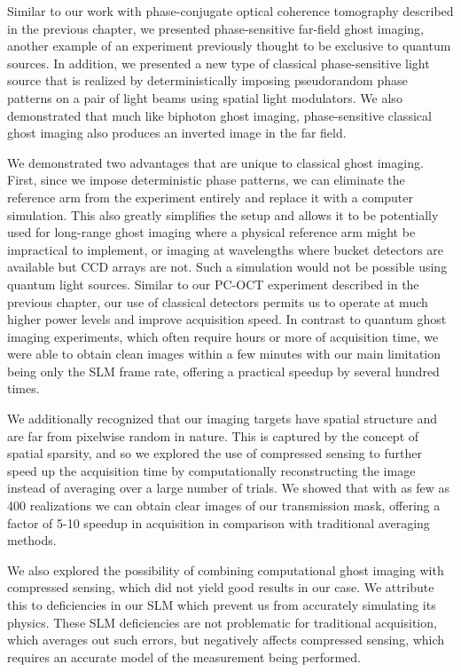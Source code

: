 Similar to our work with phase-conjugate optical coherence tomography described in the previous chapter, we presented phase-sensitive far-field ghost imaging, another example of an experiment previously thought to be exclusive to quantum sources. In addition, we presented a new type of classical phase-sensitive light source that is realized by deterministically imposing pseudorandom phase patterns on a pair of light beams using spatial light modulators. We also demonstrated that much like biphoton ghost imaging, phase-sensitive classical ghost imaging also produces an inverted image in the far field.

We demonstrated two advantages that are unique to classical ghost imaging. First, since we impose deterministic phase patterns, we can eliminate the reference arm from the experiment entirely and replace it with a computer simulation. This also greatly simplifies the setup and allows it to be potentially used for long-range ghost imaging where a physical reference arm might be impractical to implement, or imaging at wavelengths where bucket detectors are available but CCD arrays are not. Such a simulation would not be possible using quantum light sources. Similar to our PC-OCT experiment described in the previous chapter, our use of classical detectors permits us to operate at much higher power levels and improve acquisition speed. In contrast to quantum ghost imaging experiments, which often require hours or more of acquisition time, we were able to obtain clean images within a few minutes with our main limitation being only the SLM frame rate, offering a practical speedup by several hundred times.

We additionally recognized that our imaging targets have spatial structure and are far from pixelwise random in nature. This is captured by the concept of spatial sparsity, and so we explored the use of compressed sensing to further speed up the acquisition time by computationally reconstructing the image instead of averaging over a large number of trials. We showed that with as few as 400 realizations we can obtain clear images of our transmission mask, offering a factor of 5-10 speedup in acquisition in comparison with traditional averaging methods.

We also explored the possibility of combining computational ghost imaging with compressed sensing, which did not yield good results in our case. We attribute this to deficiencies in our SLM which prevent us from accurately simulating its physics. These SLM deficiencies are not problematic for traditional acquisition, which averages out such errors, but negatively affects compressed sensing, which requires an accurate model of the measurement being performed. 
